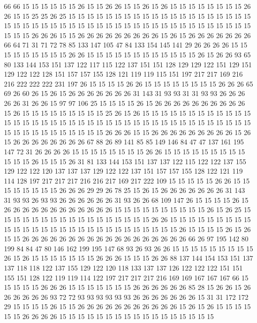 66 66 15 15 15 15 15 15 26 15 15 26 26 15 15 26 15 26 15 15
15 15 15 15 15 15 26 26 15 15 25 25 26 25 15 15 15 15 15 15
15 15 15 15 15 15 15 15 15 15 15 15 15 15 15 15 15 15 15 15
15 15 15 15 15 15 15 15 15 15 15 15 15 15 15 15 15 15 15 15
15 15 15 15 26 26 26 15 15 26 26 26 26 26 26 26 26 26 15 26
15 26 26 26 26 26 26 26 66 64 71 31 71 72 78 85 133 147 105 47
84 133 154 145 141 29 26 26 26 26 15 15 15 15 15 15 15 15 15 26
26 15 15 15 15 15 15 15 15 15 15 15 15 26 15 26 26 93 65 80
133 144 153 151 137 122 117 115 122 137 151 151 128 129 129 122 151 129 151 129
122 122 128 151 157 157 155 128 121 119 119 115 151 197 217 217 169 216 216 222
222 222 231 197 26 15 15 15 15 26 26 15 15 15 15 15 15 15 15 26
26 26 65 69 26 60 26 15 26 15 26 26 26 26 26 26 26 31 143 31
93 93 31 31 93 93 26 26 26 26 26 31 26 26 15 97 97 106 25 15
15 15 15 26 15 26 26 26 26 26 26 26 26 26 26 15 26 15 15 15
15 15 15 15 15 15 25 26 15 26 15 15 15 15 15 15 15 15 15 15
15 15 15 15 15 15 15 15 15 15 15 15 15 15 15 15 15 15 15 15
15 15 15 15 15 15 15 15 15 15 15 15 15 15 15 15 15 15 15 15
26 26 26 15 15 26 26 26 26 26 26 26 26 26 15 26 15 26 26 26
26 26 26 26 26 67 88 26 89 141 85 85 149 146 84 47 47 137 161 195
147 72 31 26 26 26 26 15 15 15 15 15 15 15 15 26 26 15 15 15
15 15 15 15 15 15 15 15 15 26 15 15 15 26 31 81 133 144 153 151
137 137 122 115 122 122 137 155 129 122 122 120 137 137 137 129 122 122 137 151
157 157 155 128 122 121 119 114 128 197 217 217 217 216 216 217 169 217 222 109
15 15 15 15 15 26 26 15 15 15 15 15 15 15 15 26 26 26 29 29
26 78 25 15 26 15 26 26 26 26 26 26 26 31 143 31 93 93 26 93
93 26 26 26 26 26 26 31 93 26 26 68 109 147 26 15 15 15 15 26
15 26 26 26 26 26 26 26 26 26 26 26 26 15 15 15 15 15 15 15
15 15 15 26 15 26 25 15 15 15 15 15 15 15 15 15 15 15 15 15
15 15 15 15 26 26 15 15 15 15 15 15 15 15 15 15 15 15 15 15
15 15 15 15 15 15 15 15 15 15 15 15 15 15 26 15 15 15 15 26
15 26 15 15 26 26 26 26 26 26 26 26 26 26 26 26 26 26 26 26
26 26 66 26 97 195 142 80 199 84 84 47 80 146 162 199 195 147 68 93
26 93 26 26 15 15 15 15 15 15 15 15 15 26 15 26 15 15 15 15
15 15 15 26 26 26 15 15 15 26 26 88 137 144 154 153 151 137 137 118
118 122 137 155 129 122 120 118 133 137 137 126 122 122 122 151 151 155 151 128
122 119 119 114 122 197 217 217 217 216 169 169 167 167 167 66 15 15 15 15
15 26 26 26 15 15 15 15 15 15 15 26 26 26 26 26 26 85 28 15
26 26 15 26 26 26 26 26 26 93 72 72 93 93 93 93 93 93 26 26
26 26 26 26 26 15 31 31 172 172 29 15 15 15 15 26 15 15 26 26
26 26 26 26 26 26 26 26 26 15 26 15 26 15 15 15 15 15 15 26
26 26 26 15 15 15 15 15 15 15 15 15 15 15 15 15 15 15 15 15
